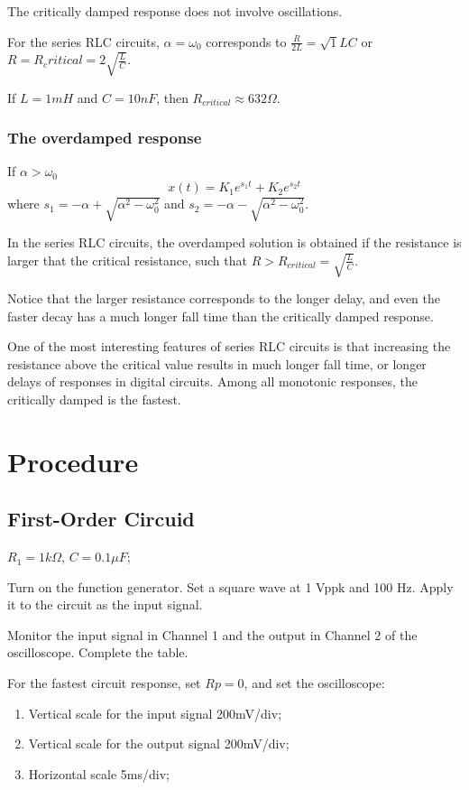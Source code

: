 \documentclass{article}
\begin{document}
The critically damped response does not involve oscillations.

For the series RLC circuits, $\alpha=\omega_0$ corresponds to $\frac{R}{2L}=\sqrt{1}{LC}$ or $R=R_critical=2\sqrt{\frac{L}{C}}$.

If $L=1mH$ and $C=10nF$, then $R_{critical}\approx632\Omega$.
\subsubsection{The overdamped response}
If $\alpha>\omega_0$
$$x(t)=K_1e^{s_1t}+K_2e^{s_2t}$$
where $s_1=-\alpha+\sqrt{\alpha^2-\omega_0^2}$ and $s_2=-\alpha-\sqrt{\alpha^2-\omega_0^2}$.

In the series RLC circuits, the overdamped solution is obtained if the
resistance is larger that the critical resistance, such that $R>R_{critical}=\sqrt{\frac{L}{C}}$.

Notice that the larger resistance corresponds to the longer delay, and even the
faster decay has a much longer fall time than the critically damped response.

One of the most interesting features of series RLC circuits is that increasing
the resistance above the critical value results in much longer fall time, or longer
delays of responses in digital circuits. Among all monotonic responses, the
critically damped is the fastest.
\section{Procedure}
\subsection{First-Order Circuid}
$R_1=1k\Omega$, $C=0.1\mu F$;

Turn on the function generator. Set a square wave at 1 Vppk and 100 Hz. Apply it
to the circuit as the input signal.

Monitor the input signal in Channel 1 and the output in Channel 2 of the
oscilloscope. Complete the table.

For the fastest circuit response, set $Rp=0$, and set the oscilloscope:
\begin{enumerate}
	\item Vertical scale for the input signal 200mV/div;
	\item Vertical scale for the output signal 200mV/div;
	\item Horizontal scale 5ms/div;
\end{enumerate}
\end{document}
